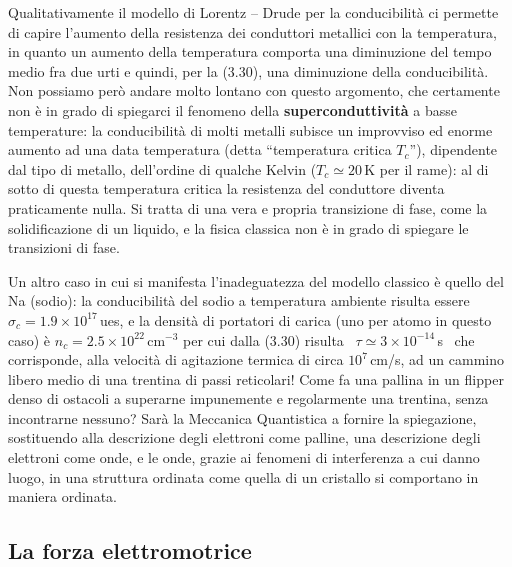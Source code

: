 Qualitativamente il modello di Lorentz -- Drude per la conducibilit\`a ci
permette di capire l'aumento della resistenza dei conduttori metallici con la
temperatura, in quanto un aumento della temperatura comporta una diminuzione del
tempo medio fra due urti e quindi, per la (3.30), una diminuzione della
conducibilit\`a. Non possiamo per\`o andare molto lontano con questo argomento,
che certamente non \`e in grado di spiegarci il fenomeno della
\textbf{superconduttivit\`a} a basse temperature: la conducibilit\`a di molti
metalli subisce un improvviso ed enorme aumento ad una data temperatura (detta
``temperatura critica $T_c$''), dipendente dal tipo di metallo, dell'ordine di
qualche Kelvin ($T_c\simeq20$\,K per il rame): al di sotto di questa temperatura
critica la resistenza del conduttore diventa praticamente nulla. Si tratta di
una vera e propria transizione di fase, come la solidificazione di un liquido, e
la fisica classica non \`e in grado di spiegare le transizioni di fase.

Un altro caso in cui si manifesta l'inadeguatezza del modello classico \`e
quello del Na (sodio): la conducibilit\`a del sodio a temperatura ambiente
risulta essere $\sigma_c=1.9\times10^{17}$\,ues, e la densit\`a di portatori di
carica (uno per atomo in questo caso) \`e
$n_c=2.5\times10^{22}\,\mathrm{cm^{-3}}$ per cui dalla (3.30) risulta
\ $\tau\simeq3\times10^{-14}$\,s \ che corrisponde, alla velocit\`a di
agitazione termica di circa $10^7$\,cm/s, ad un cammino libero medio di una
trentina di passi reticolari! Come fa una pallina in un flipper denso di
ostacoli a superarne impunemente e regolarmente una trentina, senza incontrarne
nessuno? Sar\`a la Meccanica Quantistica a fornire la spiegazione, sostituendo
alla descrizione degli elettroni come palline, una descrizione degli elettroni
come onde, e le onde, grazie ai fenomeni di interferenza a cui danno luogo, in
una struttura ordinata come quella di un cristallo si comportano in maniera
ordinata.

\subsection{La forza elettromotrice}

